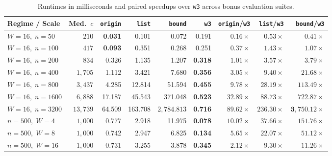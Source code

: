 \documentclass[10pt, a4paper]{article}
\newcommand{\code}[1]{\texttt{\color{primary!90!black}#1}}
\begin{document}
\vspace{-0.15em}
\begin{table}[H]
\centering
\caption{Runtimes in milliseconds and paired speedups over \code{w3} across bonus evaluation suites.}
\label{tab:bonus}
\renewcommand{\arraystretch}{0.94}
\setlength{\tabcolsep}{3.6pt}
\footnotesize
\begin{tabular}{@{}lrrrrrrrr@{}}
\toprule
\textbf{\color{primary}Regime / Scale} & \textbf{\color{primary}Med.\ $c$} & \textbf{\color{primary}\code{origin}} & \textbf{\color{primary}\code{list}} & \textbf{\color{primary}\code{bound}} & \textbf{\color{primary}\code{w3}} & \textbf{\color{primary}\code{origin}/\code{w3}} & \textbf{\color{primary}\code{list}/\code{w3}} & \textbf{\color{primary}\code{bound}/\code{w3}} \\
\midrule
$W\!=\!16,\; n\!=\!50$    & $210$    & \textbf{0.031} & 0.101 & 0.072 & 0.191 & $0.16\times$ & $0.53\times$ & $0.41\times$ \\
$W\!=\!16,\; n\!=\!100$   & $417$    & \textbf{0.093} & 0.351 & 0.268 & 0.251 & $0.37\times$ & $1.43\times$ & $1.07\times$ \\
$W\!=\!16,\; n\!=\!200$   & $834$    & 0.326 & 1.135 & 1.207 & \textbf{0.318} & $1.01\times$ & $3.57\times$ & $3.79\times$ \\
$W\!=\!16,\; n\!=\!400$   & $1{,}705$ & 1.112 & 3.421 & 7.680 & \textbf{0.356} & $\mathbf{3.05\times}$ & $\mathbf{9.40\times}$ & $\mathbf{21.68\times}$ \\
$W\!=\!16,\; n\!=\!800$   & $3{,}437$ & 4.285 & 12.814 & 51.594 & \textbf{0.455} & $\mathbf{9.78\times}$ & $\mathbf{28.19\times}$ & $\mathbf{113.49\times}$ \\
$W\!=\!16,\; n\!=\!1600$  & $6{,}888$ & 17.187 & 45.543 & 371.048 & \textbf{0.523} & $\mathbf{32.89\times}$ & $\mathbf{88.73\times}$ & $\mathbf{722.87\times}$ \\
$W\!=\!16,\; n\!=\!3200$  & $13{,}739$ & 64.509 & 163.708 & $2{,}784.813$ & \textbf{0.716} & $\mathbf{89.62\times}$ & $\mathbf{236.30\times}$ & $\mathbf{3{,}750.12\times}$ \\
\midrule
$n\!=\!500,\; W\!=\!4$    & $1{,}000$ & 0.777 & 2.918 & 11.975 & \textbf{0.078} & $\mathbf{10.02\times}$ & $\mathbf{37.66\times}$ & $\mathbf{151.76\times}$ \\
$n\!=\!500,\; W\!=\!8$    & $1{,}000$ & 0.742 & 2.947 & 6.825  & \textbf{0.134} & $\mathbf{5.65\times}$  & $\mathbf{22.07\times}$ & $\mathbf{51.12\times}$ \\
$n\!=\!500,\; W\!=\!16$   & $1{,}000$ & 0.731 & 3.255 & 3.878  & \textbf{0.345} & $\mathbf{2.12\times}$  & $\mathbf{9.30\times}$  & $\mathbf{11.26\times}$ \\

\end{tabular}
\end{table}
\end{document}
